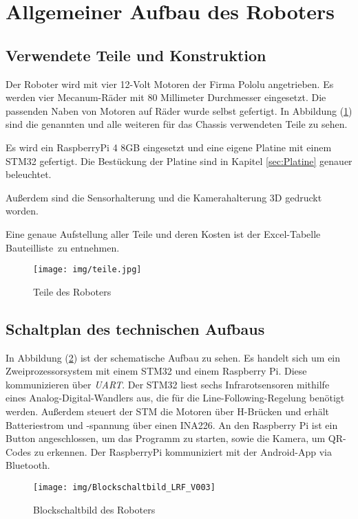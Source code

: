 \documentclass[12pt, a4paper]{report}
\begin{document}
\section{Allgemeiner Aufbau des Roboters}

\subsection{Verwendete Teile und Konstruktion}

Der Roboter wird mit vier 12-Volt Motoren der Firma Pololu angetrieben. Es werden vier Mecanum-Räder mit 80 Millimeter Durchmesser eingesetzt. Die passenden Naben von Motoren auf Räder wurde selbst gefertigt. In Abbildung (\ref{img:Teile}) sind die genannten und alle weiteren für das Chassis verwendeten Teile zu sehen.

Es wird ein RaspberryPi 4 8GB eingesetzt und eine eigene Platine mit einem STM32 gefertigt. Die Bestückung der Platine sind in Kapitel \ref{sec:Platine} genauer beleuchtet.

Außerdem sind die Sensorhalterung und die Kamerahalterung 3D gedruckt worden.

Eine genaue Aufstellung aller Teile und deren Kosten ist der Excel-Tabelle \glqq Bauteilliste\grqq ~zu entnehmen.

\begin{figure}[!ht]
    \centering
    \texttt{[image: img/teile.jpg]}
    \caption{Teile des Roboters}
    \label{img:Teile}
\end{figure} 
\FloatBarrier

\subsection{Schaltplan des technischen Aufbaus}

In Abbildung (\ref{Schematic}) ist der schematische Aufbau zu sehen. Es handelt sich um ein Zweiprozessorsystem mit einem STM32 und einem Raspberry Pi. Diese kommunizieren über \textit{UART}. Der STM32 liest sechs Infrarotsensoren mithilfe eines Analog-Digital-Wandlers aus, die für die Line-Following-Regelung benötigt werden. Außerdem steuert der STM die Motoren über H-Brücken und erhält Batteriestrom und -spannung über einen INA226. An den Raspberry Pi ist ein Button angeschlossen, um das Programm zu starten, sowie die Kamera, um QR-Codes zu erkennen. Der RaspberryPi kommuniziert mit der Android-App via Bluetooth.

\begin{figure}[h]
   \texttt{[image: img/Blockschaltbild\_LRF\_V003]}
   \caption{Blockschaltbild des Roboters}
   \label{Schematic}
\end{figure}
\FloatBarrier
\end{document}
